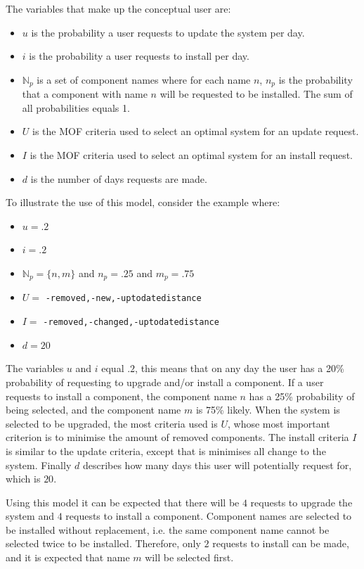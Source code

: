 The variables that make up the conceptual user are: 
\begin{itemize}
  \item $u$ is the probability a user requests to update the system per day.
  \item $i$ is the probability a user requests to install per day.
  \item $\mathbb{N}_p$ is a set of component names where for each name $n$, $n_p$ is the probability that a component with name $n$ will be requested to be installed.
  The sum of all probabilities equals 1.
  \item $U$ is the MOF criteria used to select an optimal system for an update request.
  \item $I$ is the MOF criteria used to select an optimal system for an install request.
  \item $d$ is the number of days requests are made.
\end{itemize}

To illustrate the use of this model, consider the example where:
\begin{itemize}
  \item $u =.2$
  \item $i =.2$
  \item $\mathbb{N}_p = \{n,m\}$ and  $n_p = .25$ and $m_p = .75$
  \item $U = $ \texttt{-removed,-new,-uptodatedistance}
  \item $I = $ \texttt{-removed,-changed,-uptodatedistance}
  \item $d = 20$
\end{itemize}
The variables $u$ and $i$ equal $.2$, this means that on any day the user has a 20\% probability of requesting to upgrade and/or install a component.
If a user requests to install a component, the component name $n$ has a 25\% probability of being selected, and the component name $m$ is 75\% likely. 
When the system is selected to be upgraded, the most criteria used is $U$, whose most important criterion is to minimise the amount of removed components.
The install criteria $I$ is similar to the update criteria, except that is minimises all change to the system.
Finally $d$ describes how many days this user will potentially request for, which is $20$.

Using this model it can be expected that there will be $4$ requests to upgrade the system and $4$ requests to install a component.
Component names  are selected to be installed without replacement, i.e. the same component name cannot be selected twice to be installed.
Therefore, only $2$ requests to install can be made, and it is expected that name $m$ will be selected first.


